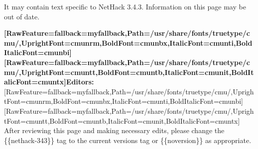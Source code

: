 It may contain text specific to NetHack 3.4.3\footnotemark[150]. Information on this page may be out of date.


{\bfseries \allowbreak{}\setmainfont{cmunbx.ttf}[RawFeature={fallback=myfallback},Path=/usr/share/fonts/truetype/cmu/,UprightFont=cmunrm,BoldFont=cmunbx,ItalicFont=cmunti,BoldItalicFont=cmunbi]\setmonofont{cmunbx.ttf}[RawFeature={fallback=myfallback},Path=/usr/share/fonts/truetype/cmu/,UprightFont=cmuntt,BoldFont=cmuntb,ItalicFont=cmunit,BoldItalicFont=cmuntx]\bfseries Editors:}{$\text{ }$}\allowbreak{}\setmainfont{cmunrm.ttf}[RawFeature={fallback=myfallback},Path=/usr/share/fonts/truetype/cmu/,UprightFont=cmunrm,BoldFont=cmunbx,ItalicFont=cmunti,BoldItalicFont=cmunbi]\setmonofont{cmunrm.ttf}[RawFeature={fallback=myfallback},Path=/usr/share/fonts/truetype/cmu/,UprightFont=cmuntt,BoldFont=cmuntb,ItalicFont=cmunit,BoldItalicFont=cmuntx] After reviewing this page and making necessary edits, please change the \{\{nethack-{}343\}\} tag to the current version\textquotesingle{}s tag or \{\{noversion\}\} as appropriate.




